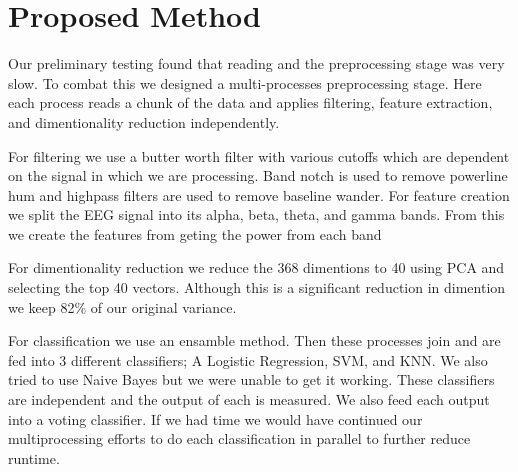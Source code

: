 \section{Proposed Method}
\label{sec:proposed_method}

Our preliminary testing found that reading and the preprocessing stage
was very slow.
To combat this we designed a multi-processes preprocessing stage.
Here each process reads a chunk of the data and applies filtering,
feature extraction, and dimentionality reduction independently.

For filtering we use a butter worth filter with various cutoffs which are dependent on the signal in which we are processing.
Band notch is used to remove powerline hum and highpass filters are used to remove
baseline wander.
For feature creation we split the EEG signal into its alpha, beta, theta, and gamma bands.
From this we create the features from geting the power from each band

For dimentionality reduction we reduce the 368 dimentions to 40 using PCA
and selecting the top 40 vectors.
Although this is a significant reduction in dimention we keep 82\% of our
original variance.

For classification we use an ensamble method.
Then these processes join and are fed into 3 different classifiers;
A Logistic Regression, SVM, and KNN.
We also tried to use Naive Bayes but we were unable to get it working.
These classifiers are independent and the output of each is measured.
We also feed each output into a voting classifier.
If we had time we would have continued our multiprocessing efforts to do each
classification in parallel to further reduce runtime.
